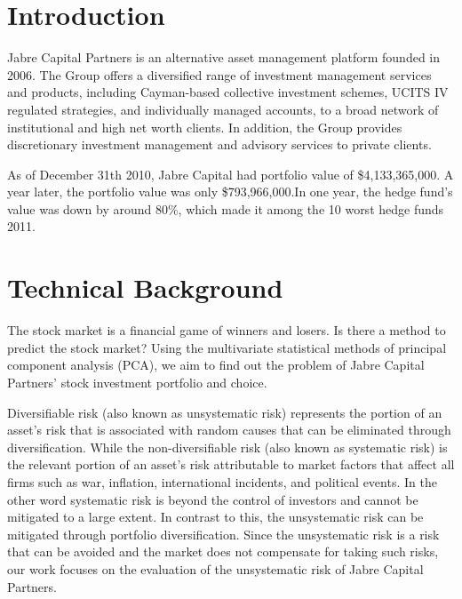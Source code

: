\documentclass[oneside,12pt]{report}
\begin{document}


\renewcommand{\thefootnote}{\arabic{footnote}}
\setcounter{footnote}{0}


\chapter{Introduction}\label{Introduction}
Jabre Capital Partners is an alternative asset management platform founded in 2006. The Group offers a diversified range of investment management services and products, including Cayman-based collective investment schemes, UCITS IV regulated strategies, and individually managed accounts, to a broad network of institutional and high net worth clients. In addition, the Group provides discretionary investment management and advisory services to private clients.

As of December 31th 2010, Jabre Capital had portfolio value of \$4,133,365,000. A year later, the portfolio value was only \$793,966,000.In one year, the hedge fund's value was down by around 80\%, which made it among the 10 worst hedge funds 2011.   

\chapter{Technical Background}\label{Technical Background}
The stock market is a financial game of winners and losers. Is there a method to predict the stock market? Using the multivariate statistical methods of principal component analysis (PCA), we aim to find out the problem of Jabre Capital Partners’ stock investment portfolio and choice. 

Diversifiable risk (also known as unsystematic risk) represents the portion of an asset’s risk that is associated with random causes that can be eliminated through diversification. While the non-diversifiable risk (also known as systematic risk) is the relevant portion of an asset’s risk attributable to market factors that affect all firms such as war, inflation, international incidents, and political events. In the other word systematic risk is beyond the control of investors and cannot be mitigated to a large extent. In contrast to this, the unsystematic risk can be mitigated through portfolio diversification. Since the unsystematic risk is a risk that can be avoided and the market does not compensate for taking such risks, our work focuses on the evaluation of the unsystematic risk of Jabre Capital Partners.
\end{document}
